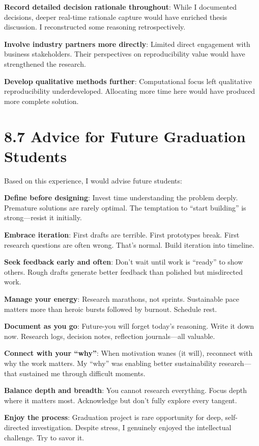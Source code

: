 \documentclass[
  oneside,
  open=any]{scrbook}
\begin{document}
\textbf{Record detailed decision rationale throughout}: While I
documented decisions, deeper real-time rationale capture would have
enriched thesis discussion. I reconstructed some reasoning
retrospectively.

\textbf{Involve industry partners more directly}: Limited direct
engagement with business stakeholders. Their perspectives on
reproducibility value would have strengthened the research.

\textbf{Develop qualitative methods further}: Computational focus left
qualitative reproducibility underdeveloped. Allocating more time here
would have produced more complete solution.

\section{8.7 Advice for Future Graduation
Students}\label{advice-for-future-graduation-students}

Based on this experience, I would advise future students:

\textbf{Define before designing}: Invest time understanding the problem
deeply. Premature solutions are rarely optimal. The temptation to
``start building'' is strong---resist it initially.

\textbf{Embrace iteration}: First drafts are terrible. First prototypes
break. First research questions are often wrong. That's normal. Build
iteration into timeline.

\textbf{Seek feedback early and often}: Don't wait until work is
``ready'' to show others. Rough drafts generate better feedback than
polished but misdirected work.

\textbf{Manage your energy}: Research marathons, not sprints.
Sustainable pace matters more than heroic bursts followed by burnout.
Schedule rest.

\textbf{Document as you go}: Future-you will forget today's reasoning.
Write it down now. Research logs, decision notes, reflection
journals---all valuable.

\textbf{Connect with your ``why''}: When motivation wanes (it will),
reconnect with why the work matters. My ``why'' was enabling better
sustainability research---that sustained me through difficult moments.

\textbf{Balance depth and breadth}: You cannot research everything.
Focus depth where it matters most. Acknowledge but don't fully explore
every tangent.

\textbf{Enjoy the process}: Graduation project is rare opportunity for
deep, self-directed investigation. Despite stress, I genuinely enjoyed
the intellectual challenge. Try to savor it.
\end{document}
